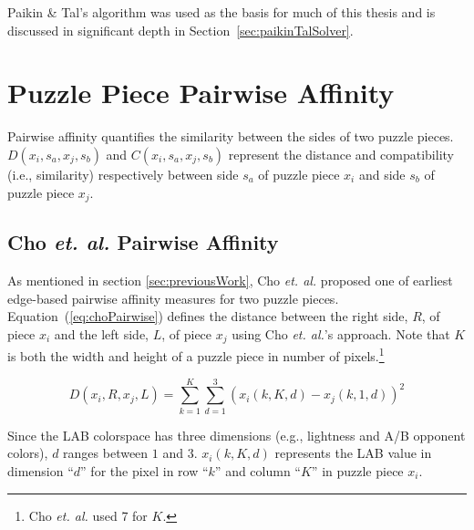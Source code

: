 \documentclass{report}
\def\eref#1{(\ref{#1})}
\begin{document}
Paikin \& Tal's algorithm was used as the basis for much of this thesis and is discussed in significant depth in Section~\ref{sec:paikinTalSolver}.















\pagebreak
\section{Puzzle Piece Pairwise Affinity}\label{sec:piecePairwiseAffinity}

Pairwise affinity quantifies the similarity between the sides of two puzzle pieces.  $D(x_i, s_a, x_j, s_b)$ and $C(x_i, s_a, x_j, s_b)$ represent the distance and compatibility (i.e., similarity) respectively between side $s_a$ of puzzle piece $x_i$ and side $s_b$ of puzzle piece $x_j$.  

\subsection{Cho \textit{et. al.} Pairwise Affinity}\label{sec:choPairwiseAffinity}

As mentioned in section \ref{sec:previousWork}, Cho \textit{et. al.} \cite{cho2010} proposed one of earliest edge-based pairwise affinity measures for two puzzle pieces.  Equation~\eref{eq:choPairwise} defines the distance between the right side, $R$, of piece $x_i$ and the left side, $L$, of piece $x_j$ using Cho \textit{et. al.}'s approach.  Note that $K$ is both the width and height of a puzzle piece in number of pixels.\footnote{Cho \textit{et. al.} used 7 for $K$.}

\begin{equation} \label{eq:choPairwise}
D(x_i,R,x_j,L) = \sum_{k=1}^{K}\sum_{d=1}^{3}(x_i(k,K,d) - x_j(k,1,d))^2
\end{equation}

Since the LAB colorspace has three dimensions (e.g., lightness and A/B opponent colors), $d$ ranges between $1$ and $3$.  $x_i(k,K,d)$ represents the LAB value in dimension ``$d$'' for the pixel in row ``$k$'' and column ``$K$'' in puzzle piece $x_i$.
\end{document}
